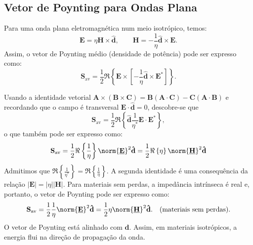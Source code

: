 \subsection{Vetor de Poynting para Ondas Plana}

Para uma onda plana eletromagnética num meio isotrópico, temos:
\begin{equation}
    \mathbf{E} = \eta \mathbf{H} \times \mathbf{\hat{d}},\qquad
    \mathbf{H} = -\frac{1}{\eta} \mathbf{\hat{d}} \times \mathbf{E}.
\end{equation}
Assim, o vetor de Poynting médio (densidade de potência) pode ser expresso como:
\begin{equation}
    \mathbf{S}_\text{av} = \frac{1}{2} \Re \left\{ \mathbf{E} \times \left[-\frac{1}{\eta} \mathbf{\hat{d}} \times \mathbf{E}^* \right] \right\}.
\end{equation}

Usando a identidade vetorial $ \mathbf{A} \times (\mathbf{B} \times     \mathbf{C}) = \mathbf{B}(\mathbf{A} \cdot \mathbf{C}) - \mathbf{C}(\mathbf{A} \cdot \mathbf{B}) $ e recordando que o campo é transversal $ \mathbf{E} \cdot \mathbf{\hat{d}} = 0 $, descobre-se que
\begin{equation}
    \mathbf{S}_\text{av} = \frac{1}{2} \Re \left\{\mathbf{\hat{d}}\frac{1}{\eta^*}  \mathbf{E} \cdot \mathbf{E}^* \right\},
\end{equation}
o que também pode ser expresso como:
\begin{equation}
    \mathbf{S}_\text{av} = \frac{1}{2} \Re \left\{ \frac{1}{\eta} \right\}\norm{\mathbf{\underline{E}}}^2 \mathbf{\hat{d}} = \frac{1}{2} \Re \left\{\eta\right\} \norm{\mathbf{\underline{H}}}^2\mathbf{\hat{d}}
\end{equation}
Admitimos que $\Re \left\{  \frac{1}{\eta^*} \right\} = \Re \left\{ \frac{1}{\eta} \right\}$. A segunda identidade é uma consequência da relação $ |\mathbf{E}| = |\eta| |\mathbf{H}| $. Para materiais sem perdas, a impedância intrínseca é real e, portanto, o vetor de Poynting pode ser expresso como:
\begin{equation}
    \mathbf{S}_\text{av} = \frac{1}{2} \frac{1}{\eta}\norm{ \mathbf{\underline{E}}}^2 \mathbf{\hat{d}} = \frac{1}{2} \eta \norm{\mathbf{\underline{H}}}^2 \mathbf{\hat{d}}. \quad \text{(materiais sem perdas)}.
\end{equation}
O vetor de Poynting está alinhado com $\mathbf{\hat{d}}$. Assim, em materiais isotrópicos, a energia flui na direção de propagação da onda.%

